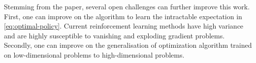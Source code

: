 \documentclass{article}
\begin{document}
Stemming from the paper, several open challenges can further improve this work. First, one can improve on the algorithm to learn the intractable expectation in \cref{eq:optimal-policy}. Current reinforcement learning methods have high variance and are highly susceptible to vanishing and exploding gradient problems. Secondly, one can improve on the generalisation of optimization algorithm trained on low-dimensional problems to high-dimensional problems.

\printbibliography
\end{document}
